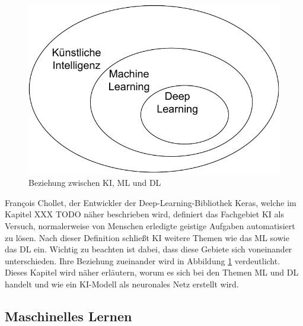 \begin{figure}
    \includegraphics[width=\textwidth/2]{abbildungen/KI_ML_DL.pdf}
    \caption{Beziehung zwischen \ac{KI}, \ac{ML} und \ac{DL} \cite[vgl. S.22]{DL_PY}}
    \label{fig:KI_ML_DL}

\end{figure} 

François Chollet, der Entwickler der Deep-Learning-Bibliothek Keras, welche im Kapitel XXX TODO näher beschrieben wird, definiert
das Fachgebiet \ac{KI} als \glqq [den] Versuch, normalerweise von Menschen erledigte geistige Aufgaben automatisiert zu lösen\grqq \cite[S.22]{DL_PY}.
Nach dieser Definition schließt \ac{KI} weitere Themen wie das \ac{ML} sowie das \ac{DL} ein. Wichtig zu beachten ist dabei,
dass diese Gebiete sich voneinander unterschieden. Ihre Beziehung zueinander wird in Abbildung \ref*{fig:KI_ML_DL} verdeutlicht.\\

Dieses Kapitel wird näher erläutern, worum es sich bei den Themen \ac{ML} und \ac{DL} handelt und wie ein \ac{KI}-Modell als neuronales Netz erstellt wird.

\subsection{Maschinelles Lernen}

